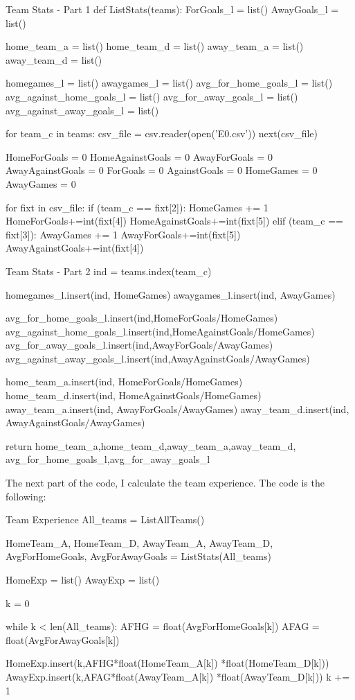 \documentclass[12pt]{article}
\begin{document}
\begin{codelisting}{Team Stats - Part 1}
def ListStats(teams):
	ForGoals_l = list()
	AwayGoals_l = list()

	home_team_a = list()
	home_team_d = list()
	away_team_a = list()
	away_team_d = list()

	homegames_l = list()
	awaygames_l = list()
	avg_for_home_goals_l = list()
	avg_against_home_goals_l = list()
	avg_for_away_goals_l = list()
	avg_against_away_goals_l = list()

	for team_c in teams:
		csv_file = csv.reader(open('E0.csv'))
		next(csv_file)

		HomeForGoals = 0
		HomeAgainstGoals = 0
		AwayForGoals = 0
		AwayAgainstGoals = 0
		ForGoals = 0
		AgainstGoals = 0
		HomeGames = 0
		AwayGames = 0

		for fixt in csv_file:	
			if (team_c == fixt[2]):
			       HomeGames += 1
			       HomeForGoals+=int(fixt[4])
			       HomeAgainstGoals+=int(fixt[5])
			elif (team_c == fixt[3]):
			       AwayGames += 1
			       AwayForGoals+=int(fixt[5])
			       AwayAgainstGoals+=int(fixt[4])
\end{codelisting}

\begin{codelisting}{Team Stats - Part 2}
ind = teams.index(team_c)

homegames_l.insert(ind, HomeGames)
awaygames_l.insert(ind, AwayGames)

avg_for_home_goals_l.insert(ind,HomeForGoals/HomeGames)
avg_against_home_goals_l.insert(ind,HomeAgainstGoals/HomeGames)
avg_for_away_goals_l.insert(ind,AwayForGoals/AwayGames)
avg_against_away_goals_l.insert(ind,AwayAgainstGoals/AwayGames)

home_team_a.insert(ind, HomeForGoals/HomeGames)
home_team_d.insert(ind, HomeAgainstGoals/HomeGames)
away_team_a.insert(ind, AwayForGoals/AwayGames)
away_team_d.insert(ind, AwayAgainstGoals/AwayGames)

return home_team_a,home_team_d,away_team_a,away_team_d,
avg_for_home_goals_l,avg_for_away_goals_l
\end{codelisting}

The next part of the code, I calculate the team experience. The code is the following:

\begin{codelisting}{Team Experience}
All_teams = ListAllTeams()

HomeTeam_A, HomeTeam_D, AwayTeam_A, AwayTeam_D, 
AvgForHomeGoals, AvgForAwayGoals = ListStats(All_teams)
	
HomeExp = list()
AwayExp = list()

k = 0

while k < len(All_teams):
	AFHG = float(AvgForHomeGoals[k])
	AFAG = float(AvgForAwayGoals[k])


	HomeExp.insert(k,AFHG*float(HomeTeam_A[k])
*float(HomeTeam_D[k]))
	AwayExp.insert(k,AFAG*float(AwayTeam_A[k])
*float(AwayTeam_D[k]))
	k += 1
\end{codelisting}
\end{document}
